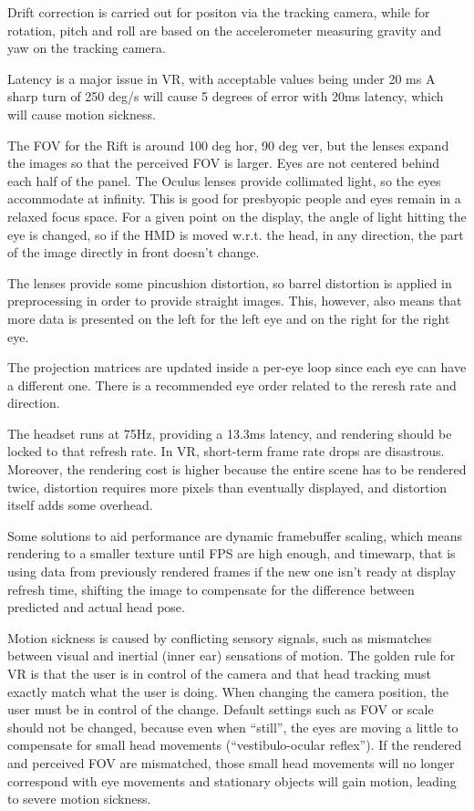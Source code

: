 \documentclass[a4paper]{article}
\begin{document}
Drift correction is carried out for positon via the tracking camera,
while for rotation, pitch and roll are based on the accelerometer
measuring gravity and yaw on the tracking camera.

Latency is a major issue in VR, with acceptable values being under 20 ms
A sharp turn of 250 deg/s will cause 5 degrees of error with 20ms
latency, which will cause motion sickness.

The FOV for the Rift is around 100 deg hor, 90 deg ver, but the lenses
expand the images so that the perceived FOV is larger. Eyes are not
centered behind each half of the panel. The Oculus lenses provide
collimated light, so the eyes accommodate at infinity. This is good for
presbyopic people and eyes remain in a relaxed focus space. For a given
point on the display, the angle of light hitting the eye is changed, so
if the HMD is moved w.r.t. the head, in any direction, the part of the
image directly in front doesn't change.

The lenses provide some pincushion distortion, so barrel distortion is
applied in preprocessing in order to provide straight images. This,
however, also means that more data is presented on the left for the left
eye and on the right for the right eye.

The projection matrices are updated inside a per-eye loop since each eye
can have a different one. There is a recommended eye order related to
the reresh rate and direction.

The headset runs at 75Hz, providing a 13.3ms latency, and rendering
should be locked to that refresh rate. In VR, short-term frame rate
drops are disastrous. Moreover, the rendering cost is higher because the
entire scene has to be rendered twice, distortion requires more pixels
than eventually displayed, and distortion itself adds some overhead.

Some solutions to aid performance are dynamic framebuffer scaling, which
means rendering to a smaller texture until FPS are high enough, and
timewarp, that is using data from previously rendered frames if the new
one isn't ready at display refresh time, shifting the image to
compensate for the difference between predicted and actual head pose.

Motion sickness is caused by conflicting sensory signals, such as
mismatches between visual and inertial (inner ear) sensations of motion.
The golden rule for VR is that the user is in control of the camera and
that head tracking must exactly match what the user is doing. When
changing the camera position, the user must be in control of the change.
Default settings such as FOV or scale should not be changed, because
even when ``still'', the eyes are moving a little to compensate for
small head movements (``vestibulo-ocular reflex''). If the rendered and
perceived FOV are mismatched, those small head movements will no longer
correspond with eye movements and stationary objects will gain motion,
leading to severe motion sickness.
\end{document}
